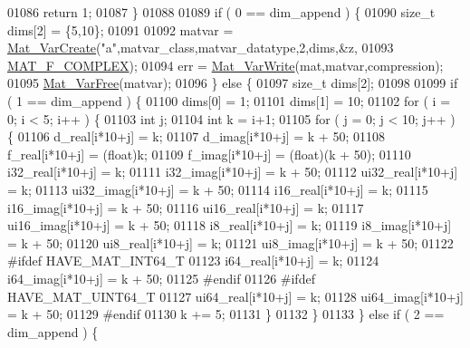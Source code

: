 \begin{DoxyCode}
{{{01086             \textcolor{keywordflow}{return} 1;
01087     \}
01088 
01089     \textcolor{keywordflow}{if} ( 0 == dim\_append ) \{
01090         \textcolor{keywordtype}{size\_t} dims[2] = \{5,10\};
01091 
01092         matvar = \hyperlink{group___m_a_t_ga1c54a84bb4d810c6fccdb8869489eac4}{Mat\_VarCreate}(\textcolor{stringliteral}{"a"},matvar\_class,matvar\_datatype,2,dims,&z,
01093                                \hyperlink{group___m_a_t_ggab9d6ef9e3ddca78a317b173f01d53fbbacd7b091a11184aad7fc6078c04470780}{MAT\_F\_COMPLEX});
01094         err = \hyperlink{group___m_a_t_ga4bd3eba12df415d8226e27c457fbbb0b}{Mat\_VarWrite}(mat,matvar,compression);
01095         \hyperlink{group___m_a_t_ga1d14716f7450530fd1c9d02413787f0e}{Mat\_VarFree}(matvar);
01096     \} \textcolor{keywordflow}{else} \{
01097         \textcolor{keywordtype}{size\_t} dims[2];
01098 
01099         \textcolor{keywordflow}{if} ( 1 == dim\_append ) \{
01100             dims[0] = 1;
01101             dims[1] = 10;
01102             \textcolor{keywordflow}{for} ( i = 0; i < 5; i++ ) \{
01103                 \textcolor{keywordtype}{int} j;
01104                 \textcolor{keywordtype}{int} k = i+1;
01105                 \textcolor{keywordflow}{for} ( j = 0; j < 10; j++ ) \{
01106                       d\_real[i*10+j] = k;
01107                       d\_imag[i*10+j] = k + 50;
01108                       f\_real[i*10+j] = (float)k;
01109                       f\_imag[i*10+j] = (float)(k + 50);
01110                     i32\_real[i*10+j] = k;
01111                     i32\_imag[i*10+j] = k + 50;
01112                    ui32\_real[i*10+j] = k;
01113                    ui32\_imag[i*10+j] = k + 50;
01114                     i16\_real[i*10+j] = k;
01115                     i16\_imag[i*10+j] = k + 50;
01116                    ui16\_real[i*10+j] = k;
01117                    ui16\_imag[i*10+j] = k + 50;
01118                      i8\_real[i*10+j] = k;
01119                      i8\_imag[i*10+j] = k + 50;
01120                     ui8\_real[i*10+j] = k;
01121                     ui8\_imag[i*10+j] = k + 50;
01122 \textcolor{preprocessor}{#ifdef HAVE\_MAT\_INT64\_T}
01123                     i64\_real[i*10+j] = k;
01124                     i64\_imag[i*10+j] = k + 50;
01125 \textcolor{preprocessor}{#endif}
01126 \textcolor{preprocessor}{#ifdef HAVE\_MAT\_UINT64\_T}
01127                    ui64\_real[i*10+j] = k;
01128                    ui64\_imag[i*10+j] = k + 50;
01129 \textcolor{preprocessor}{#endif}
01130                     k += 5;
01131                 \}
01132             \}
01133         \} \textcolor{keywordflow}{else} \textcolor{keywordflow}{if} ( 2 == dim\_append ) \{
}}}
\end{DoxyCode}
